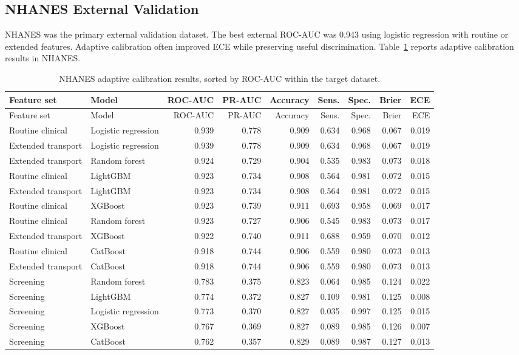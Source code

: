 \documentclass[11pt]{article}
\begin{document}
\subsection{NHANES External Validation}
NHANES was the primary external validation dataset. The best external ROC-AUC was 0.943 using logistic regression with routine or extended features. Adaptive calibration often improved ECE while preserving useful discrimination. Table~\ref{tab:nhanes_adaptive} reports adaptive calibration results in NHANES.

\begin{landscape}
\begin{longtable}{llrrrrrrr}
\caption{NHANES adaptive calibration results, sorted by ROC-AUC within the target dataset.}
\label{tab:nhanes_adaptive}\\
\toprule
Feature set & Model & ROC-AUC & PR-AUC & Accuracy & Sens. & Spec. & Brier & ECE \\
\midrule
\endfirsthead
\toprule
Feature set & Model & ROC-AUC & PR-AUC & Accuracy & Sens. & Spec. & Brier & ECE \\
\midrule
\endhead
Routine clinical & Logistic regression & 0.939 & 0.778 & 0.909 & 0.634 & 0.968 & 0.067 & 0.019 \\
Extended transport & Logistic regression & 0.939 & 0.778 & 0.909 & 0.634 & 0.968 & 0.067 & 0.019 \\
Extended transport & Random forest & 0.924 & 0.729 & 0.904 & 0.535 & 0.983 & 0.073 & 0.018 \\
Routine clinical & LightGBM & 0.923 & 0.734 & 0.908 & 0.564 & 0.981 & 0.072 & 0.015 \\
Extended transport & LightGBM & 0.923 & 0.734 & 0.908 & 0.564 & 0.981 & 0.072 & 0.015 \\
Routine clinical & XGBoost & 0.923 & 0.739 & 0.911 & 0.693 & 0.958 & 0.069 & 0.017 \\
Routine clinical & Random forest & 0.923 & 0.727 & 0.906 & 0.545 & 0.983 & 0.073 & 0.017 \\
Extended transport & XGBoost & 0.922 & 0.740 & 0.911 & 0.688 & 0.959 & 0.070 & 0.012 \\
Routine clinical & CatBoost & 0.918 & 0.744 & 0.906 & 0.559 & 0.980 & 0.073 & 0.013 \\
Extended transport & CatBoost & 0.918 & 0.744 & 0.906 & 0.559 & 0.980 & 0.073 & 0.013 \\
Screening & Random forest & 0.783 & 0.375 & 0.823 & 0.064 & 0.985 & 0.124 & 0.022 \\
Screening & LightGBM & 0.774 & 0.372 & 0.827 & 0.109 & 0.981 & 0.125 & 0.008 \\
Screening & Logistic regression & 0.773 & 0.370 & 0.827 & 0.035 & 0.997 & 0.125 & 0.015 \\
Screening & XGBoost & 0.767 & 0.369 & 0.827 & 0.089 & 0.985 & 0.126 & 0.007 \\
Screening & CatBoost & 0.762 & 0.357 & 0.829 & 0.089 & 0.987 & 0.127 & 0.013 \\
\bottomrule
\end{longtable}
\end{landscape}
\end{document}
